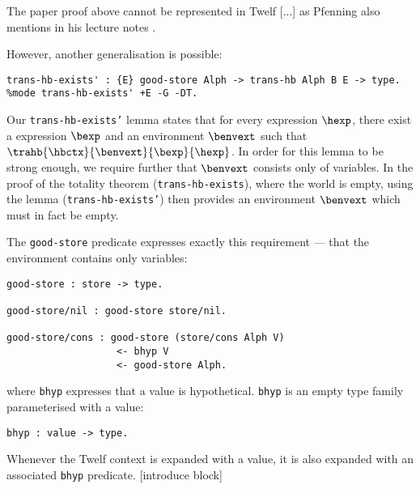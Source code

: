 The paper proof above cannot be represented in Twelf [...] as Pfenning also mentions in his lecture notes \cite{Pfenning01}.




However, another generalisation is possible:
\begin{verbatim}
trans-hb-exists' : {E} good-store Alph -> trans-hb Alph B E -> type.
%mode trans-hb-exists' +E -G -DT.
\end{verbatim}
Our \texttt{trans-hb-exists'} lemma states that for every \hlang expression $\hexp$, there exist a \blang expression $\bexp$ and an environment $\benvext$ such that $\trahb{\hbctx}{\benvext}{\bexp}{\hexp}$.
In order for this lemma to be strong enough, we require further that $\benvext$ consists only of variables.
In the proof of the totality theorem (\texttt{trans-hb-exists}), where the world is empty, using the lemma (\texttt{trans-hb-exists'}) then provides an environment $\benvext$ which must in fact be empty.

The \texttt{good-store} predicate expresses exactly this requirement --- that the environment contains only variables:
\begin{verbatim}
good-store : store -> type.

good-store/nil : good-store store/nil.

good-store/cons : good-store (store/cons Alph V)
                   <- bhyp V
                   <- good-store Alph.
\end{verbatim}
where \texttt{bhyp} expresses that a value is hypothetical.
\texttt{bhyp} is an empty type family parameterised with a \blang value:
\begin{verbatim}
bhyp : value -> type.
\end{verbatim}
Whenever the Twelf context is expanded with a value, it is also expanded with an associated \texttt{bhyp} predicate.
[introduce block]

